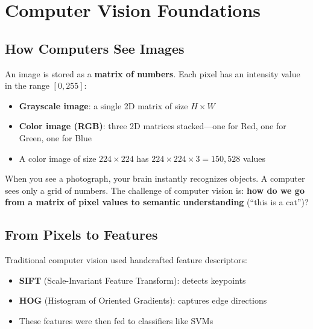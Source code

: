 \documentclass[11pt,a4paper]{article}
\begin{document}
\section{Computer Vision Foundations}

\subsection{How Computers See Images}

An image is stored as a \textbf{matrix of numbers}. Each pixel has an intensity value in the range $[0, 255]$:

\begin{itemize}[leftmargin=1.5em]
    \item \textbf{Grayscale image}: a single 2D matrix of size $H \times W$
    \item \textbf{Color image (RGB)}: three 2D matrices stacked---one for Red, one for Green, one for Blue
    \item A color image of size $224 \times 224$ has $224 \times 224 \times 3 = 150{,}528$ values
\end{itemize}

\begin{tcolorbox}[intuitionbox={Intuition}]
When you see a photograph, your brain instantly recognizes objects. A computer sees only a grid of numbers. The challenge of computer vision is: \textbf{how do we go from a matrix of pixel values to semantic understanding} (``this is a cat'')?
\end{tcolorbox}

\subsection{From Pixels to Features}

Traditional computer vision used handcrafted feature descriptors:
\begin{itemize}[leftmargin=1.5em]
    \item \textbf{SIFT} (Scale-Invariant Feature Transform): detects keypoints
    \item \textbf{HOG} (Histogram of Oriented Gradients): captures edge directions
    \item These features were then fed to classifiers like SVMs
\end{itemize}
\end{document}
